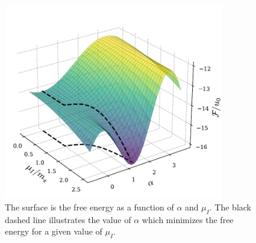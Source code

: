 \begin{figure}[htb]
    \centering
    \includegraphics[width=0.85\textwidth]{../scripts/figurer/free_energy_surface.pdf}
    \caption{
        The surface is the free energy as a function of $\alpha$ and $\mu_I$.
        The black dashed line illustrates the value of $\alpha$ which minimizes the free energy for a given value of $\mu_I$.
    }
    \label{fig: free energy surface}
\end{figure}


